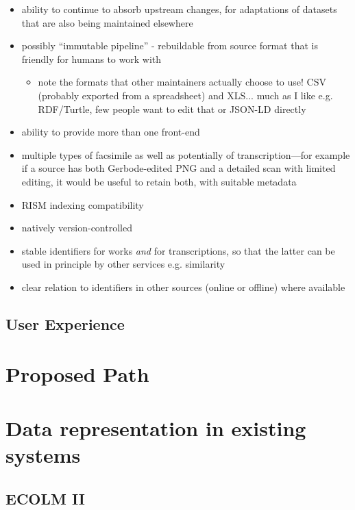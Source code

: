 \documentclass[twocolumn,10pt]{paper}
\begin{document}
\begin{sloppypar}
  \begin{itemize}
  \item ability to continue to absorb upstream changes, for
    adaptations of datasets that are also being maintained elsewhere
  \item possibly ``immutable pipeline'' - rebuildable from source
    format that is friendly for humans to work with
    \begin{itemize}
      \item note the formats that other maintainers actually choose to
        use! CSV (probably exported from a spreadsheet) and
        XLS... much as I like e.g. RDF/Turtle, few people want to edit
        that or JSON-LD directly
    \end{itemize}
  \item ability to provide more than one front-end
    \item multiple types of facsimile as well as potentially of
      transcription---for example if a source has both Gerbode-edited
      PNG and a detailed scan with limited editing, it would be useful
      to retain both, with suitable metadata
  \item RISM indexing compatibility
  \item natively version-controlled
  \item stable identifiers for works {\em and} for transcriptions, so
    that the latter can be used in principle by other services
    e.g. similarity
  \item clear relation to identifiers in other sources (online or
    offline) where available
  \end{itemize}

  
  \subsection{User Experience}

  \section{Proposed Path}

  \clearpage

  \section{Data representation in existing systems}

  \subsection{ECOLM II}
  

\end{sloppypar}
\end{document}
